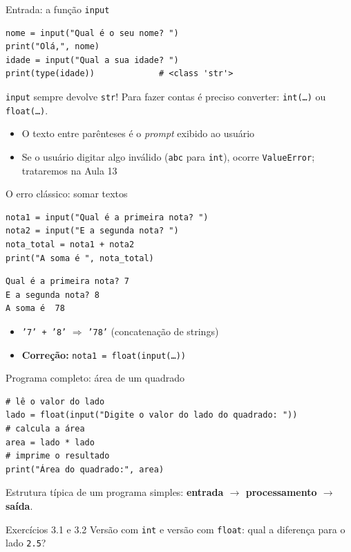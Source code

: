 \documentclass[aspectratio=169,10pt,t]{beamer}
\begin{document}
\begin{frame}[fragile]{Entrada: a função \texttt{input}}
\begin{lstlisting}
nome = input("Qual é o seu nome? ")
print("Olá,", nome)
idade = input("Qual a sua idade? ")
print(type(idade))             # <class 'str'>
\end{lstlisting}
  \begin{alertblock}{\texttt{input} sempre devolve \texttt{str}!}
    Para fazer contas é preciso converter: \texttt{int(\ldots)} ou \texttt{float(\ldots)}.
  \end{alertblock}
  \begin{itemize}
    \item O texto entre parênteses é o \emph{prompt} exibido ao usuário
    \item Se o usuário digitar algo inválido (\texttt{abc} para \texttt{int}), ocorre \texttt{ValueError}; trataremos na Aula 13
  \end{itemize}
\end{frame}

\begin{frame}[fragile]{O erro clássico: somar textos}
\begin{lstlisting}
nota1 = input("Qual é a primeira nota? ")
nota2 = input("E a segunda nota? ")
nota_total = nota1 + nota2
print("A soma é ", nota_total)
\end{lstlisting}
\begin{lstlisting}[style=saida]
Qual é a primeira nota? 7
E a segunda nota? 8
A soma é  78
\end{lstlisting}
  \begin{itemize}
    \item \texttt{'7' + '8'} \(\Rightarrow\) \texttt{'78'} (concatenação de strings)
    \item \textbf{Correção:} \texttt{nota1 = float(input(\ldots))}
  \end{itemize}
\end{frame}

\begin{frame}[fragile]{Programa completo: área de um quadrado}
\begin{lstlisting}
# lê o valor do lado
lado = float(input("Digite o valor do lado do quadrado: "))
# calcula a área
area = lado * lado
# imprime o resultado
print("Área do quadrado:", area)
\end{lstlisting}
  Estrutura típica de um programa simples: \textbf{entrada \(\to\) processamento \(\to\) saída}.
  \begin{exampleblock}{Exercícios 3.1 e 3.2}
    Versão com \texttt{int} e versão com \texttt{float}: qual a diferença para o lado \texttt{2.5}?
  \end{exampleblock}
\end{frame}
\end{document}
